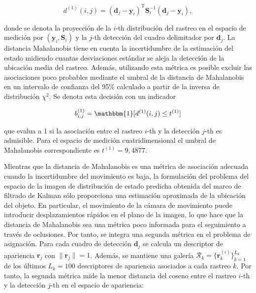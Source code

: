 \begin{equation}
\label{eq:equation1-deepsort}
d^{(1)} (i,j) = (\boldsymbol{d}_{j} - \boldsymbol{y}_{i})^{\text{T}} \boldsymbol{S}_{i}^{-1} (\boldsymbol{d}_{j} - \boldsymbol{y}_{i}),
\end{equation}

donde se denota la proyección de la $i$-th distribución del rastreo en el espacio de medición por $(\boldsymbol{y}_{i}, \boldsymbol{S}_{i})$ y la $j$-th detección del cuadro delimitador por $\boldsymbol{d}_{j}$. La distancia Mahalanobis tiene en cuenta la incertidumbre de la estimación del estado midiendo cuantas desviaciones estándar se aleja la detección de la ubicación media del rastreo. Además, utilizando esta métrica es posible excluir las asociaciones poco probables mediante el umbral de la distancia de Mahalanobis en un intervalo de confianza del 95\% calculado a partir de la inversa de distribución $\chi^{2}$. Se denota esta decisión con un indicador

\begin{equation}
\label{eq:equation2-deepsort}
b_{i,j}^{(1)} = \mathbbm{1}[d^{(1)} (i,j) \leq t^{(1)}]
\end{equation}

que evalua a 1 si la asociación entre el rastreo $i$-th y la detección $j$-th es admisible. Para el espacio de medición cuatridimensional el umbral de Mahalanobis correspondiente es $t^{(1)} = 9,4877$.

Mientras que la distancia de Mahalanobis es una métrica de asociación adecuada cuando la incertidumbre del movimiento es baja, la formulación del problema del espacio de la imagen de distribución de estado predicha obtenida del marco de filtrado de Kalman sólo proporciona una estimación aproximada de la ubicación del objeto. En particular, el movimiento de la cámara de movimiento puede introducir desplazamientos rápidos en el plano de la imagen, lo que hace que la distancia de Mahalanobis sea una métrica poco informada para el seguimiento a través de oclusiones. Por tanto, se integra una segunda métrica en el problema de asignación. Para cada cuadro de detección $\boldsymbol{d}_{j}$ se calcula un descriptor de apariencia $\boldsymbol{r}_{j}$ con $\parallel \boldsymbol{r}_{j} \parallel = 1$. Además, se mantiene una galería $\mathcal{R}_{k} = \{\boldsymbol{r}_{k}^{(i)}\}_{k=1}^{L_{k}}$ de los últimos $L_{k} = 100$ descriptores de apariencia asociados a cada rastreo $k$. Por tanto, la segunda métrica mide la menor distancia del coseno entre el rastreo $i$-th y la detección $j$-th en el espacio de apariencia:

